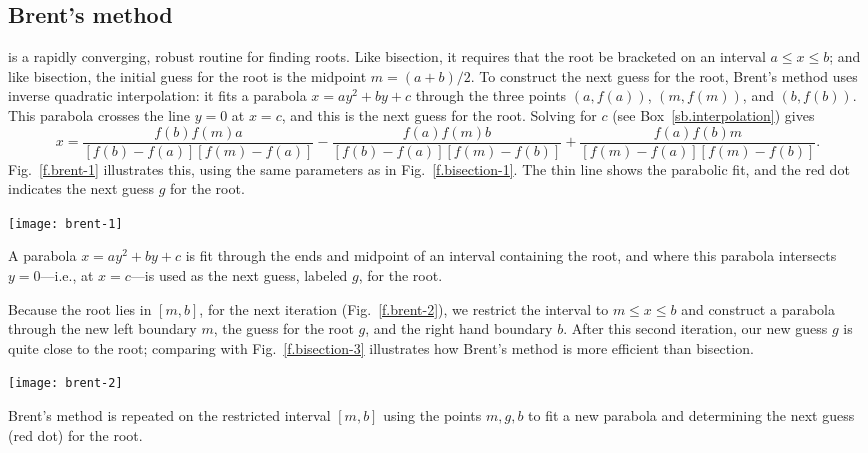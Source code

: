 \subsection{Brent's method}
\cite{Brent1973Algorithms-for-} is a rapidly converging, robust routine for finding roots. Like bisection, it requires that the root be bracketed on an interval $a\le x
\le b$; and like bisection, the initial guess for the root is the midpoint $m = (a+b)/2$. To construct the next guess for the root, Brent's method uses inverse quadratic interpolation: it fits a parabola $x = ay^{2}+ by + c$ through the three points $(a,f(a))$, $(m,f(m))$, and $(b,f(b))$.  This parabola crosses the line $y=0$ at $x=c$, and this is the next guess for the root. Solving for $c$ (see Box~\ref{sb.interpolation}) gives
\[
x = \frac{f(b)f(m)a}{[f(b)-f(a)][f(m)-f(a)]} - \frac{f(a)f(m)b}{[f(b)-f(a)][f(m)-f(b)]} 
        + \frac{f(a)f(b)m}{[f(m)-f(a)][f(m)-f(b)]}.
\]
Fig.~\ref{f.brent-1} illustrates this, using the same parameters as in Fig.~\ref{f.bisection-1}. The thin line shows the parabolic fit, and the red dot indicates the next guess $g$ for the root.
\begin{marginfigure}
\texttt{[image: brent-1]}
\caption[Brent's method]{A parabola $x=ay^{2}+by+c$ is fit through the ends and midpoint of an interval containing the root, and where this parabola intersects $y=0$---i.e., at $x=c$---is used as the next guess, labeled $g$, for the root.\label{f.brent-1}}
\end{marginfigure}

Because the root lies in $[m,b]$, for the next iteration (Fig.~\ref{f.brent-2}), we restrict the interval to $m\le x\le b$ and construct a parabola through the new left boundary $m$, the guess for the root $g$, and the right hand boundary $b$. After this second iteration, our new guess $g$ is quite close to the root; comparing with Fig.~\ref{f.bisection-3} illustrates how Brent's method is more efficient than bisection.
\begin{marginfigure}
\texttt{[image: brent-2]}
\caption[Second iteration, Brent's method]{Brent's method is repeated on the restricted interval $[m,b]$ using the points $m,g,b$ to fit a new parabola and determining the next guess (red dot) for the root.\label{f.brent-2}}
\end{marginfigure}

